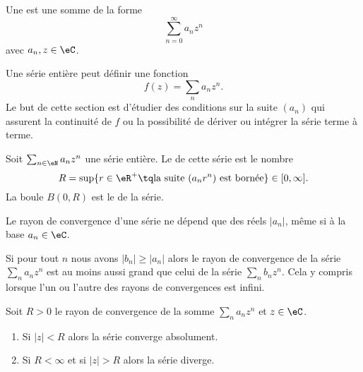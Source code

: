 \begin{definition}
    Une  est une somme de la forme
    \begin{equation}
        \sum_{n=0}^{\infty}a_nz^n
    \end{equation}
    avec \( a_n,z\in\eC\).    
\end{definition}
Une série entière peut définir une fonction
\begin{equation}
    f(z)=\sum_na_nz^n.
\end{equation}
Le but de cette section est d'étudier des conditions sur la suite \( (a_n)\) qui assurent la continuité de \( f\) ou la possibilité de dériver ou intégrer la série terme à terme.

\begin{definition}  \label{DefZWKOZOl}
    Soit \( \sum_{n\in \eN}a_nz^n\) une série entière. Le  de cette série est le nombre
    \begin{equation}
        R=\sup\{ r\in \eR^+\tq \text{la suite }(a_nr^n)\text{ est bornée} \}\in\mathopen[ 0 , \infty \mathclose].
    \end{equation}
    La boule \( B(0,R)\) est le  de la série.
\end{definition}
Le rayon de convergence d'une série ne dépend que des réels \( | a_n |\), même si à la base \( a_n\in \eC\).

\begin{remark}      \label{REMooYOTEooKvxHSf}
    Si pour tout \( n\) nous avons \( | b_n |\geq | a_n |\) alors le rayon de convergence de la série \( \sum_na_nz^n\) est au moins aussi grand que celui de la série \( \sum_nb_nz^n\). Cela y compris lorsque l'un ou l'autre des rayons de convergences est infini.
\end{remark}

\begin{lemma}   \label{LemmbWnFI}
    Soit \( R>0\) le rayon de convergence de la somme \( \sum_na_nz^n\) et \( z\in \eC\).
    \begin{enumerate}
        \item
            Si \( | z |<R\) alors la série converge absolument.
        \item
            Si \( R<\infty\) et si \( | z |>R\) alors la série diverge.
    \end{enumerate}
\end{lemma}


